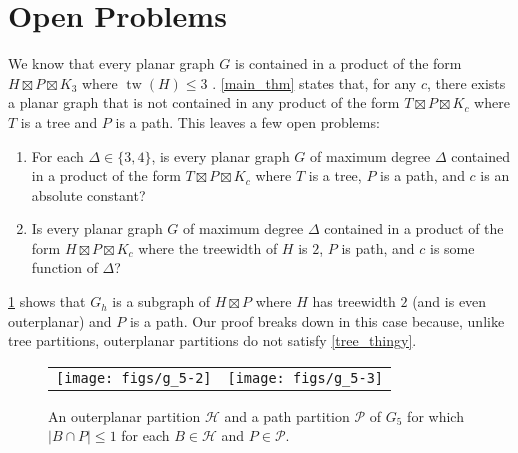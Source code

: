 \documentclass{patmorin}
\DeclareMathOperator{\tw}{tw}
\renewcommand{\le}{\leqslant}
\begin{document}
\section{Open Problems}

We know that every planar graph $G$ is contained in a product of the form $H\boxtimes P\boxtimes K_3$ where $\tw(H)\le 3$ \cite{dujmovic.joret.ea:planar}. \cref{main_thm} states that, for any $c$, there exists a planar graph that is not contained in any product of the form $T\boxtimes P\boxtimes K_c$ where $T$ is a tree and $P$ is a path.  This leaves a few open problems:

\begin{enumerate}
  \item For each $\Delta\in\{3,4\}$, is every planar graph $G$ of maximum degree $\Delta$ contained in a product of the form $T\boxtimes P\boxtimes K_c$ where $T$ is a tree, $P$ is a path, and $c$ is an absolute constant?

  \item Is every planar graph $G$ of maximum degree $\Delta$ contained in a product of the form $H\boxtimes P\boxtimes K_c$ where the treewidth of $H$ is $2$, $P$ is path, and $c$ is some function of $\Delta$?
\end{enumerate}

\cref{two_tree} shows that $G_h$ is a subgraph of $H\boxtimes P$ where $H$ has treewidth $2$ (and is even outerplanar) and $P$ is a path. Our proof breaks down in this case because, unlike tree partitions, outerplanar partitions do not satisfy \cref{tree_thingy}.

\begin{figure}
  \begin{center}
    \begin{tabular}{cc}
      \texttt{[image: figs/g\_5-2]} & \texttt{[image: figs/g\_5-3]}
    \end{tabular}
  \end{center}
  \caption{An outerplanar partition $\mathcal{H}$ and a path partition $\mathcal{P}$ of $G_5$ for which $|B\cap P|\le 1$ for each $B\in\mathcal{H}$ and $P\in\mathcal{P}$.}
  \label{two_tree}
\end{figure}



\end{document}
